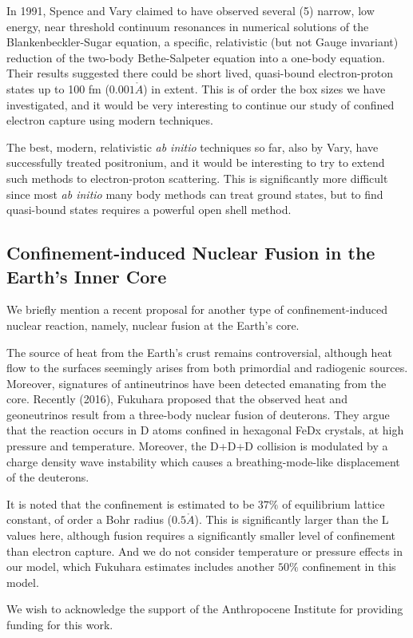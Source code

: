 \documentclass[%
 aip,
 jmp,%
 amsmath,amssymb,
 reprint,%
]{revtex4-1}
\begin{document}
In 1991, Spence and Vary claimed to have observed several (5) narrow, low energy, near threshold continuum resonances in numerical solutions of the Blankenbeckler-Sugar equation, a specific, relativistic (but not Gauge invariant) reduction of the two-body Bethe-Salpeter equation into a one-body equation. Their results suggested there could be short lived, quasi-bound electron-proton states up to 100 fm ($0.001\mathring{A}$) in extent.  This is of order the box sizes we have investigated, and it would be very interesting to continue our study of confined electron capture using modern techniques.  

The best, modern, relativistic \emph{ab initio} techniques so far, also by Vary, have successfully treated positronium,\cite{positroniumQFT} and it would be interesting to try to extend such methods to electron-proton scattering. This is significantly more difficult since most \emph{ab initio} many body methods can treat ground states, but to find quasi-bound states  requires a powerful open shell method.

\subsection{Confinement-induced Nuclear Fusion in the Earth's Inner Core}

We briefly mention a recent proposal for another type of  confinement-induced nuclear reaction,
namely, nuclear fusion at the Earth's core.

The source of heat from the Earth's crust remains controversial, although heat flow
to the surfaces seemingly arises from both primordial and radiogenic sources.
Moreover, signatures of antineutrinos have been detected emanating from the core.
Recently (2016), Fukuhara proposed that the observed heat and geoneutrinos
result from a three-body nuclear fusion of deuterons.\cite{fukuhara}  They argue that
the reaction occurs in D atoms confined in hexagonal FeDx crystals, at high pressure
and temperature.  Moreover, the D+D+D collision is modulated by a charge density wave
instability which causes a breathing-mode-like displacement of the deuterons.

It is noted that the confinement is estimated to be $37\%$ of equilibrium lattice constant,
of order a Bohr radius ($0.5\mathring{A}$).  This is significantly larger than the L values here,
although fusion requires a significantly smaller level of confinement than electron capture.
And we do not consider temperature or pressure effects in our model, which Fukuhara
estimates includes another $50\%$ confinement in this model.

\begin{acknowledgments}
We wish to acknowledge the support of the Anthropocene Institute for providing funding for this work.

\end{acknowledgments}
\end{document}
